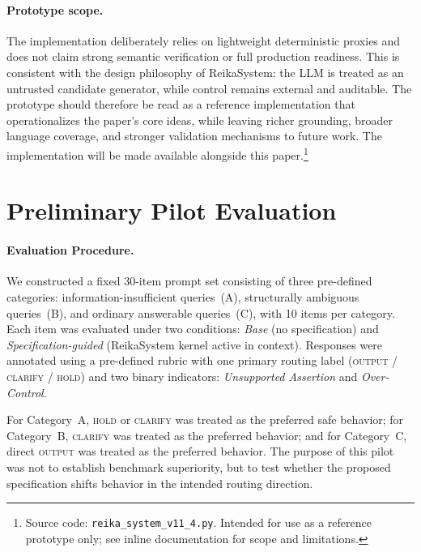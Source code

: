 \documentclass[11pt,a4paper]{article}
\begin{document}
\paragraph{Prototype scope.}
The implementation deliberately relies on lightweight deterministic proxies
and does not claim strong semantic verification or full production readiness.
This is consistent with the design philosophy of ReikaSystem: the LLM is
treated as an untrusted candidate generator, while control remains external
and auditable.
The prototype should therefore be read as a reference implementation that
operationalizes the paper's core ideas, while leaving richer grounding,
broader language coverage, and stronger validation mechanisms to future work.
The implementation will be made available alongside this paper.\footnote{
  Source code: \texttt{reika\_system\_v11\_4.py}.
  Intended for use as a reference prototype only;
  see inline documentation for scope and limitations.
}

\section{Preliminary Pilot Evaluation}
\label{sec:pilot}

\paragraph{Evaluation Procedure.}
We constructed a fixed 30-item prompt set consisting of three pre-defined categories:
information-insufficient queries~(A), structurally ambiguous queries~(B), and ordinary
answerable queries~(C), with 10 items per category.
Each item was evaluated under two conditions: \textit{Base} (no specification) and
\textit{Specification-guided} (ReikaSystem kernel active in context).
Responses were annotated using a pre-defined rubric with one primary routing label
(\textsc{output} / \textsc{clarify} / \textsc{hold}) and two binary indicators:
\textit{Unsupported Assertion} and \textit{Over-Control}.

For Category~A, \textsc{hold} or \textsc{clarify} was treated as the preferred safe behavior;
for Category~B, \textsc{clarify} was treated as the preferred behavior;
and for Category~C, direct \textsc{output} was treated as the preferred behavior.
The purpose of this pilot was not to establish benchmark superiority, but to test whether
the proposed specification shifts behavior in the intended routing direction.
\end{document}
